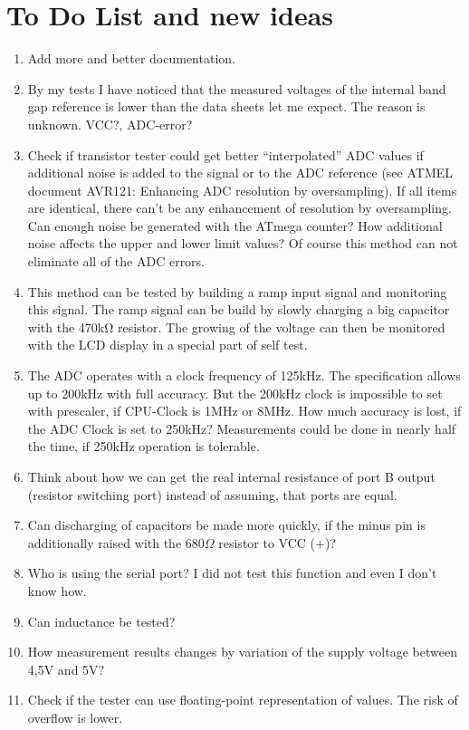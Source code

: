 
\chapter{To Do List and new ideas}
\label{sec:todo}

\begin{enumerate}
\item Add more and better documentation.
\item By my tests I have noticed that the measured voltages of the internal band gap reference is lower than the data sheets let me expect. The reason is unknown. VCC?, ADC-error?
\item Check if transistor tester could get better “interpolated” ADC values if additional noise is added to the signal or to the ADC reference (see ATMEL document AVR121: Enhancing ADC resolution by oversampling).
If all items are identical, there can't be any enhancement of resolution by oversampling. Can enough noise be generated with the ATmega counter?
How additional noise affects  the upper and lower limit values?
Of course this method can not eliminate all of the ADC errors. 
\item This method can be tested by building a ramp input signal and monitoring this signal.
The ramp signal can be build by slowly charging a big capacitor with the 470kΩ resistor.
The growing of the voltage can then be monitored with the LCD display in a special part of self test.
\item The ADC operates with a clock frequency of 125kHz. The specification allows up to 200kHz with full accuracy.
But the 200kHz clock is impossible to set with prescaler, if CPU-Clock is 1MHz or 8MHz.
How much accuracy is lost, if the ADC Clock is set to 250kHz?
Measurements could be done in nearly half the time, if 250kHz operation is tolerable.
\item Think about how we can get the real internal resistance of port B output (resistor switching port) instead of assuming, that ports are equal.
\item Can discharging of capacitors be made more quickly, if the minus pin is additionally raised
with the \(680\Omega\) resistor to VCC (+)?
\item Who is using the serial port? I did not test this function and even I don't know how.
\item Can inductance be tested?
\item How measurement results changes by variation of  the  supply voltage between 4,5V and 5V? 
\item Check if the tester can use floating-point representation of  values. The risk of overflow  is lower.

\end{enumerate}
